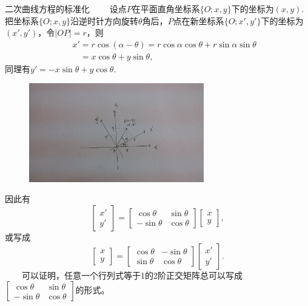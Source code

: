 \documentclass[compress,mathserif,cjk]{beamer}
\theoremstyle{remark}
\numberwithin{equation}{section}
\begin{document}
\begin{CJK}{UTF8}{gbsn}
\begin{frame}{二次曲线方程的标准化}\small
\ \ \ \ 设点$P$在平面直角坐标系$\{O;x,y\}$下的坐标为$(x,y)$. 把坐标系$\{O;x,y\}$沿逆时针方向旋转$\theta$角后，$P$点在新坐标系$\{O;x',y'\}$下的坐标为$(x',y')$，令$|OP|=r$，则
\begin{eqnarray*}
&&x'=r\cos(\alpha-\theta)=r\cos\alpha\cos\theta+r\sin\alpha\sin\theta\\
&&~~~~=x\cos\theta+y\sin\theta,
\end{eqnarray*}
同理有$y'=-x\sin\theta+y\cos\theta$.
\begin{figure}[!t]
  \centering
  \includegraphics[width=3in,bb=885 550 2505 1470,clip]{f1}
\end{figure}
\end{frame}
\begin{frame}
因此有
$$\left[\begin{matrix}x'\\y'\end{matrix}\right]=\left[\begin{matrix}\cos\theta&\sin\theta\\-\sin\theta&\cos\theta\end{matrix}\right]\left[\begin{matrix}x\\y\end{matrix}\right],$$
或写成
$$\left[\begin{matrix}x\\y\end{matrix}\right]=\left[\begin{matrix}\cos\theta&-\sin\theta\\\sin\theta&\cos\theta\end{matrix}\right]\left[\begin{matrix}x'\\y'\end{matrix}\right].$$
\pause\vskip 10pt
\ \ \ \ 可以证明，任意一个行列式等于1的2阶正交矩阵总可以写成 \\$\left[\begin{matrix}\cos\theta&\sin\theta\\-\sin\theta&\cos\theta\end{matrix}\right]$的形式。

\end{frame}
\end{CJK}
\end{document}
